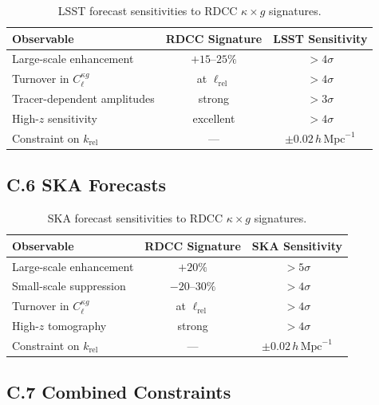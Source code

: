 \documentclass[11pt,a4paper]{article}
\begin{document}
\begin{table}[H]
\centering
\begin{tabular}{lcc}
\hline
\textbf{Observable} & \textbf{RDCC Signature} & \textbf{LSST Sensitivity} \\
\hline
Large-scale enhancement & $+15$--$25\%$ & $>4\sigma$ \\
Turnover in $C_{\ell}^{\kappa g}$ & at $\ell_{\mathrm{rel}}$ & $>4\sigma$ \\
Tracer-dependent amplitudes & strong & $>3\sigma$ \\
High-$z$ sensitivity & excellent & $>4\sigma$ \\
Constraint on $k_{\mathrm{rel}}$ & --- & $\pm 0.02\,h\,\mathrm{Mpc}^{-1}$ \\
\hline
\end{tabular}
\caption{LSST forecast sensitivities to RDCC $\kappa \times g$ signatures.}
\end{table}

\subsection*{C.6 SKA Forecasts}

\begin{table}[H]
\centering
\begin{tabular}{lcc}
\hline
\textbf{Observable} & \textbf{RDCC Signature} & \textbf{SKA Sensitivity} \\
\hline
Large-scale enhancement & $+20\%$ & $>5\sigma$ \\
Small-scale suppression & $-20$--$30\%$ & $>4\sigma$ \\
Turnover in $C_{\ell}^{\kappa g}$ & at $\ell_{\mathrm{rel}}$ & $>4\sigma$ \\
High-$z$ tomography & strong & $>4\sigma$ \\
Constraint on $k_{\mathrm{rel}}$ & --- & $\pm 0.02\,h\,\mathrm{Mpc}^{-1}$ \\
\hline
\end{tabular}
\caption{SKA forecast sensitivities to RDCC $\kappa \times g$ signatures.}
\end{table}

\subsection*{C.7 Combined Constraints}
\end{document}
